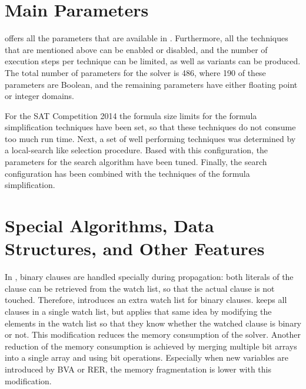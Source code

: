 \documentclass[conference]{IEEEtran}
\begin{document}
\section{Main Parameters}

\riss offers all the parameters that are available in \glucose. 
Furthermore, all the techniques that are mentioned above can be enabled or disabled, and the number of execution steps per technique can be limited, as well as variants can be produced. 
The total number of parameters for the solver is 486, where 190 of these parameters are Boolean, and the remaining parameters have either floating point or integer domains. 

For the SAT Competition 2014 the formula size limits for the formula simplification techniques have been set, so that these techniques do not consume too much run time.
Next, a set of well performing techniques was determined by a local-search like selection procedure. 
Based with this configuration, the parameters for the search algorithm have been tuned. 
Finally, the search configuration has been combined with the techniques of the formula simplification. 

\section{Special Algorithms, Data Structures, and Other Features}

In \glucose, binary clauses are handled specially during propagation: both literals of the clause can be retrieved from the watch list, so that the actual clause is not touched. 
Therefore, \glucose introduces an extra watch list for binary clauses. 
\riss keeps all clauses in a single watch list, but applies that same idea by modifying the elements in the watch list so that they know whether the watched clause is binary or not. 
This modification reduces the memory consumption of the solver. 
Another reduction of the memory consumption is achieved by merging multiple bit arrays into a single array and using bit operations. 
Especially when new variables are introduced by BVA or RER, the memory fragmentation is lower with this modification. 

\end{document}
